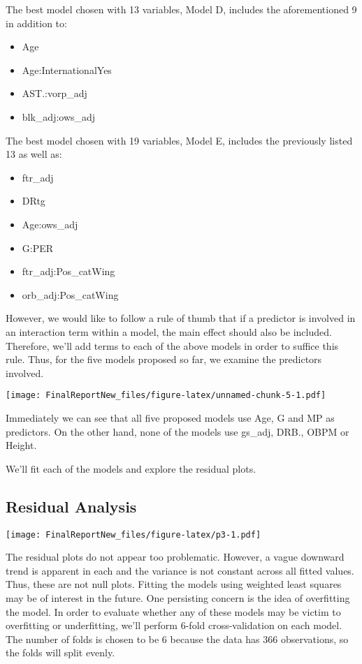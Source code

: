 \documentclass[]{article}
\providecommand{\tightlist}{%
  \setlength{\itemsep}{0pt}\setlength{\parskip}{0pt}}
\begin{document}
The best model chosen with 13 variables, Model D, includes the
aforementioned 9 in addition to:

\begin{itemize}
\tightlist
\item
  Age
\item
  Age:InternationalYes
\item
  AST.:vorp\_adj
\item
  blk\_adj:ows\_adj
\end{itemize}

The best model chosen with 19 variables, Model E, includes the
previously listed 13 as well as:

\begin{itemize}
\tightlist
\item
  ftr\_adj
\item
  DRtg
\item
  Age:ows\_adj
\item
  G:PER
\item
  ftr\_adj:Pos\_catWing
\item
  orb\_adj:Pos\_catWing
\end{itemize}

However, we would like to follow a rule of thumb that if a predictor is
involved in an interaction term within a model, the main effect should
also be included. Therefore, we'll add terms to each of the above models
in order to suffice this rule. Thus, for the five models proposed so
far, we examine the predictors involved.

\texttt{[image: FinalReportNew\_files/figure-latex/unnamed-chunk-5-1.pdf]}

Immediately we can see that all five proposed models use Age, G and MP
as predictors. On the other hand, none of the models use gs\_adj, DRB.,
OBPM or Height.

We'll fit each of the models and explore the residual plots.

\subsection{Residual Analysis}\label{residual-analysis}

\texttt{[image: FinalReportNew\_files/figure-latex/p3-1.pdf]}

The residual plots do not appear too problematic. However, a vague
downward trend is apparent in each and the variance is not constant
across all fitted values. Thus, these are not null plots. Fitting the
models using weighted least squares may be of interest in the future.
One persisting concern is the idea of overfitting the model. In order to
evaluate whether any of these models may be victim to overfitting or
underfitting, we'll perform 6-fold cross-validation on each model. The
number of folds is chosen to be 6 because the data has 366 observations,
so the folds will split evenly.
\end{document}
